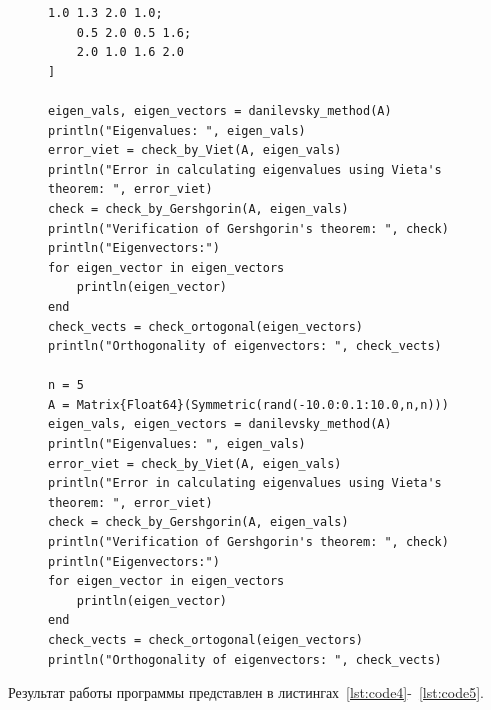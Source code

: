 \documentclass[a4paper, 14pt]{extarticle}
\begin{document}
\begin{figure}[!htb]
\begin{lstlisting}[caption={Код},label={lst:code3}]
    1.0 1.3 2.0 1.0;
    0.5 2.0 0.5 1.6;
    2.0 1.0 1.6 2.0
]

eigen_vals, eigen_vectors = danilevsky_method(A)
println("Eigenvalues: ", eigen_vals)
error_viet = check_by_Viet(A, eigen_vals)
println("Error in calculating eigenvalues using Vieta's theorem: ", error_viet)
check = check_by_Gershgorin(A, eigen_vals)
println("Verification of Gershgorin's theorem: ", check)
println("Eigenvectors:")
for eigen_vector in eigen_vectors
    println(eigen_vector)
end
check_vects = check_ortogonal(eigen_vectors)
println("Orthogonality of eigenvectors: ", check_vects)

n = 5
A = Matrix{Float64}(Symmetric(rand(-10.0:0.1:10.0,n,n)))
eigen_vals, eigen_vectors = danilevsky_method(A)
println("Eigenvalues: ", eigen_vals)
error_viet = check_by_Viet(A, eigen_vals)
println("Error in calculating eigenvalues using Vieta's theorem: ", error_viet)
check = check_by_Gershgorin(A, eigen_vals)
println("Verification of Gershgorin's theorem: ", check)
println("Eigenvectors:")
for eigen_vector in eigen_vectors
    println(eigen_vector)
end
check_vects = check_ortogonal(eigen_vectors)
println("Orthogonality of eigenvectors: ", check_vects)
\end{lstlisting}
\end{figure}

Результат работы программы представлен в листингах~\ref{lst:code4}-~\ref{lst:code5}.
\end{document}
